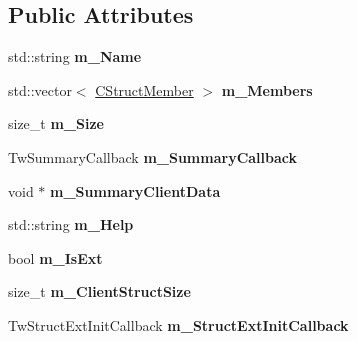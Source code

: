 \subsection*{Public Attributes}
\begin{DoxyCompactItemize}
\item 
\hypertarget{struct_c_tw_mgr_1_1_c_struct_a76aff84349225bb70f2fdcc02fcf7d4b}{std\+::string {\bfseries m\+\_\+\+Name}}\label{struct_c_tw_mgr_1_1_c_struct_a76aff84349225bb70f2fdcc02fcf7d4b}

\item 
\hypertarget{struct_c_tw_mgr_1_1_c_struct_af8c282ccbf51bdca96b36fbb1b395992}{std\+::vector$<$ \hyperlink{struct_c_tw_mgr_1_1_c_struct_member}{C\+Struct\+Member} $>$ {\bfseries m\+\_\+\+Members}}\label{struct_c_tw_mgr_1_1_c_struct_af8c282ccbf51bdca96b36fbb1b395992}

\item 
\hypertarget{struct_c_tw_mgr_1_1_c_struct_afecd9e37dbf735e6c1e6dfe9ba328638}{size\+\_\+t {\bfseries m\+\_\+\+Size}}\label{struct_c_tw_mgr_1_1_c_struct_afecd9e37dbf735e6c1e6dfe9ba328638}

\item 
\hypertarget{struct_c_tw_mgr_1_1_c_struct_ad8d6fd1c1e432da20241a5a172dab6b0}{Tw\+Summary\+Callback {\bfseries m\+\_\+\+Summary\+Callback}}\label{struct_c_tw_mgr_1_1_c_struct_ad8d6fd1c1e432da20241a5a172dab6b0}

\item 
\hypertarget{struct_c_tw_mgr_1_1_c_struct_ad5a8139a204fd3aff07c32bbba90e149}{void $\ast$ {\bfseries m\+\_\+\+Summary\+Client\+Data}}\label{struct_c_tw_mgr_1_1_c_struct_ad5a8139a204fd3aff07c32bbba90e149}

\item 
\hypertarget{struct_c_tw_mgr_1_1_c_struct_a4a2d01a2deac904b102fb24d69d2ef8d}{std\+::string {\bfseries m\+\_\+\+Help}}\label{struct_c_tw_mgr_1_1_c_struct_a4a2d01a2deac904b102fb24d69d2ef8d}

\item 
\hypertarget{struct_c_tw_mgr_1_1_c_struct_a2e9f186de8d440aed69cc6500981261b}{bool {\bfseries m\+\_\+\+Is\+Ext}}\label{struct_c_tw_mgr_1_1_c_struct_a2e9f186de8d440aed69cc6500981261b}

\item 
\hypertarget{struct_c_tw_mgr_1_1_c_struct_a80bcd3c1578c108bd940aac07f79d7dc}{size\+\_\+t {\bfseries m\+\_\+\+Client\+Struct\+Size}}\label{struct_c_tw_mgr_1_1_c_struct_a80bcd3c1578c108bd940aac07f79d7dc}

\item 
\hypertarget{struct_c_tw_mgr_1_1_c_struct_a3946be89a0fa265e5adee084bb89ef22}{Tw\+Struct\+Ext\+Init\+Callback {\bfseries m\+\_\+\+Struct\+Ext\+Init\+Callback}}\label{struct_c_tw_mgr_1_1_c_struct_a3946be89a0fa265e5adee084bb89ef22}


\end{DoxyCompactItemize}

